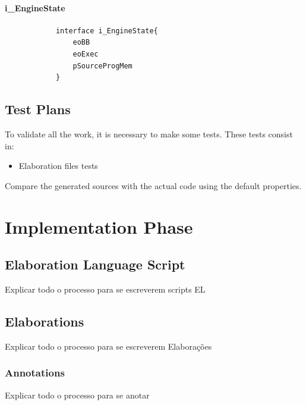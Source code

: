 \documentclass{report}
\begin{document}
			\subsubsection*{i\_EngineState}			
			
			\begin{lstlisting}
			interface i_EngineState{
				eoBB
				eoExec
				pSourceProgMem
			}
			\end{lstlisting}	

	\section{Test Plans}
	
	\par To validate all the work, it is necessary to make some tests. These tests consist in:
	\begin{itemize}
		\item Elaboration files tests
	\end{itemize}
	\par Compare the generated sources with the actual code	using the default properties.
	

\chapter{Implementation Phase}

	\section{Elaboration Language Script}
	
	\par Explicar todo o processo para se escreverem scripts EL
	
	\section{Elaborations}
	
	\par Explicar todo o processo para se escreverem Elaborações
	
	\subsection{Annotations}
	
	\par Explicar todo o processo para se anotar
	
\end{document}
